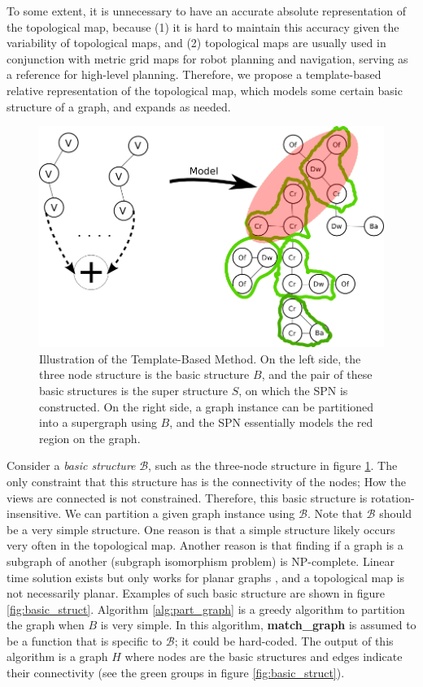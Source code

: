 \documentclass[10pt, titlepage]{article}
\theoremstyle{definition}
\begin{document}
To some extent, it is unnecessary to have an accurate absolute representation of the topological map, because (1) it is hard to maintain this accuracy given the variability of topological maps, and (2) topological maps are usually used in conjunction with metric grid maps for robot planning and navigation, serving as a reference for high-level planning. Therefore, we propose a template-based relative representation of the topological map, which models some certain basic structure of a graph, and expands as needed.

\begin{figure}[!htb]
    \centering
    \captionsetup{width=.8\linewidth}
    \includegraphics[scale=0.4]{images/big_graph.png}
    \caption{Illustration of the Template-Based Method. On the left side, the three node structure is the basic structure $B$, and the pair of these basic structures is the super structure $S$, on which the SPN is constructed. On the right side, a graph instance can be partitioned into a supergraph using $B$, and the SPN essentially models the red region on the graph.}
    \label{fig:tmpmod}
\end{figure}

Consider a \textit{basic structure} $\mathcal{B}$, such as the three-node structure in figure \ref{fig:tmpmod}. The only constraint that this structure has is the connectivity of the nodes; How the views are connected is not constrained. Therefore, this basic structure is rotation-insensitive. We can partition a given graph instance using $\mathcal{B}$. Note that $\mathcal{B}$ should be a very simple structure. One reason is that a simple structure likely occurs very often in the topological map. Another reason is that finding if a graph is a subgraph of another (subgraph isomorphism problem) is NP-complete. Linear time solution exists but only works for planar graphs \cite{eppstein1995subgraph}, and a topological map is not necessarily planar. Examples of such basic structure are shown in figure \ref{fig:basic_struct}. Algorithm \ref{alg:part_graph} is a greedy algorithm to partition the graph when $B$ is very simple. In this algorithm, \textbf{match\_graph} is assumed to be a function that is specific to $\mathcal{B}$; it could be hard-coded. The output of this algorithm is a graph $H$ where nodes are the basic structures and edges indicate their connectivity (see the green groups in figure \ref{fig:basic_struct}).
\end{document}

